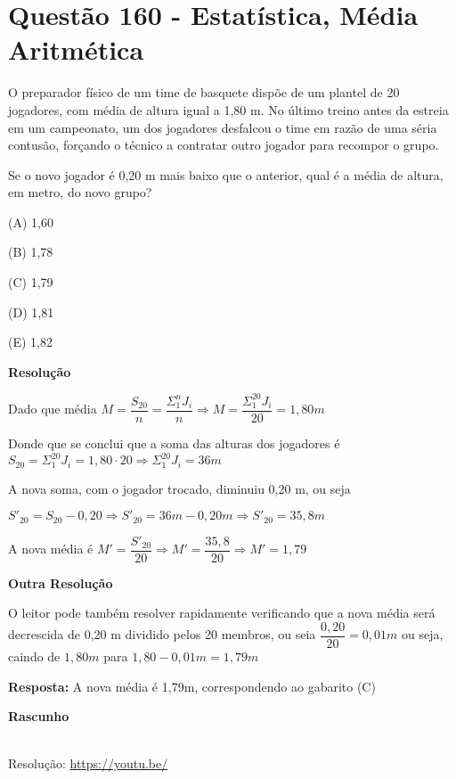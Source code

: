 \section{Questão 160 - Estatística, Média Aritmética}

O preparador físico de um time de basquete dispõe de um plantel de 20 jogadores, com média de altura igual a 1,80 m. No último treino antes da estreia em um campeonato, um dos jogadores desfalcou o time em razão de uma séria contusão, forçando o técnico a contratar outro jogador para recompor o grupo.

Se o novo jogador é 0,20 m mais baixo que o anterior, qual é a média de altura, em metro, do novo grupo?

(A)  1,60

(B)  1,78

(C)  1,79

(D)  1,81

(E)  1,82

\textbf{Resolução}

Dado que média $ M = \dfrac{S_{20}}{n} = \dfrac{\Sigma_{1}^{n} J_{i}}{n} \Rightarrow M = \dfrac{\Sigma_{1}^{20} J_{i}}{20} = 1,80m $

Donde que se conclui que a soma das alturas dos jogadores é $ S_{20} = \Sigma_{1}^{20} J_{i} = 1,80 \cdot 20 \Rightarrow \Sigma_{1}^{20} J_{i} = 36m $

A nova soma, com o jogador trocado, diminuiu 0,20 m, ou seja

$ S'_{20} = S_{20} - 0,20 \Rightarrow S'_{20} = 36m - 0,20m  \Rightarrow S'_{20} = 35,8m $

A nova média é $ M' = \dfrac{S'_{20}}{20} \Rightarrow  M' = \dfrac{35,8}{20} \Rightarrow  M' = 1,79 $

\textbf{Outra Resolução}

O leitor pode também resolver rapidamente verificando que a nova média será decrescida de 0,20 m dividido pelos 20 membros, ou seia $ \dfrac{0,20}{20} = 0,01m $ ou seja, caindo de $ 1,80m $ para $ 1,80 - 0,01m = 1,79m $ 

\textbf{Resposta:} A nova média é 1,79m, correspondendo ao gabarito (C)

\textbf{Rascunho}





\begin{center}
    \href{https://youtu.be/}{
    }\\
    Resolução: \url{https://youtu.be/}
\end{center}
